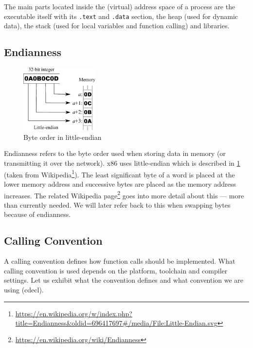 \documentclass[article]{uibk}
\begin{document}
The main parts located inside the (virtual) address space of a process are the
executable itself with its \texttt{.text} and \texttt{.data} section, the heap
(used for dynamic data), the stack (used for local variables and function
calling) and libraries.

\subsection{Endianness}
\label{sub:endianness}

\begin{figure}[H]
    \centering
    \includegraphics[width=0.35\textwidth]{gfx/little_endian.pdf}
    \caption{Byte order in little-endian}
    \label{fig:little_endian}
\end{figure}

Endianness refers to the byte order used when storing data in memory (or
transmitting it over the network). x86 uses little-endian which is described in
\cref{fig:little_endian} (taken from
Wikipedia\footnote{\url{https://en.wikipedia.org/w/index.php?title=Endianness&oldid=696417697\#/media/File:Little-Endian.svg}}).
The least significant byte of a word is placed at the lower memory address and
successive bytes are placed as the memory address increases. The related
Wikipedia page\footnote{\url{https://en.wikipedia.org/wiki/Endianness}} goes
into more detail about this --- more than currently needed. We will later refer
back to this when swapping bytes because of endianness.

\subsection{Calling Convention}
\label{sub:calling_convention}

A calling convention defines how function calls should be implemented. What
calling convention is used depends on the platform, toolchain and compiler
settings. Let us exhibit what the convention defines and what convention we are
using (cdecl).
\end{document}
